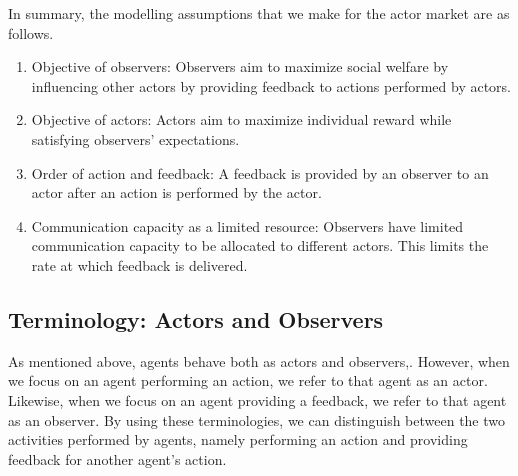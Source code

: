 \noindent In summary, the modelling assumptions that we make for the actor market are as follows.
\begin{enumerate}
    \item Objective of observers: Observers aim to maximize social welfare by influencing other actors by providing feedback to actions performed by actors.
    \item Objective of actors: Actors aim to maximize individual reward while satisfying observers' expectations.
    \item Order of action and feedback: A feedback is provided by an observer to an actor after an action is performed by the actor.
    \item Communication capacity as a limited resource: Observers have limited communication capacity to be allocated to different actors. This limits the rate at which feedback is delivered.
\end{enumerate}

\subsection{Terminology: Actors and Observers}
As mentioned above, agents behave both as actors and observers,. However, when we focus on an agent performing an action, we refer to that agent as an actor. Likewise, when we focus on an agent providing a feedback, we refer to that agent as an observer. By using these terminologies, we can distinguish between the two activities performed by agents, namely performing an action and providing feedback for another agent's action. \\ 



% 